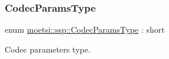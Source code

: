 \mbox{\label{namespacemoetsi_1_1ssp_a6d638ba0bd38e9daded08f633d893563}} 
\subsubsection{\texorpdfstring{Codec\+Params\+Type}{CodecParamsType}\hspace{0.1cm}{\footnotesize\ttfamily [1/2]}}
{\footnotesize\ttfamily enum \hyperlink{namespacemoetsi_1_1ssp_a6d638ba0bd38e9daded08f633d893563}{moetsi\+::ssp\+::\+Codec\+Params\+Type} \+: short\hspace{0.3cm}{\ttfamily [strong]}}



Codec parameters type. 

